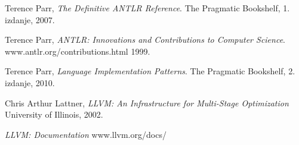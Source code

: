 \begin{thebibliography}{9}

	Terence Parr,
	\emph{The Definitive ANTLR Reference}.
	The Pragmatic Bookshelf,
	1. izdanje,
	2007.
   
	Terence Parr,
	\emph{ANTLR: Innovations and Contributions to Computer Science}.
	www.antlr.org/contributions.html
	1999.

	Terence Parr,
	\emph{Language Implementation Patterns}.
	The Pragmatic Bookshelf,
	2. izdanje,
	2010.

	Chris Arthur Lattner,
	\emph{LLVM: An Infrastructure for Multi-Stage Optimization}
	University of Illinois, 2002.
	
	\emph{LLVM: Documentation}
	www.llvm.org/docs/
	

\end{thebibliography}